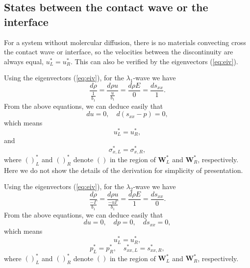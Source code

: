 \documentclass{article}
\numberwithin{equation}{section}
\numberwithin{table}{section}
\begin{document}
  \subsection{States between the  contact wave or the interface}
  For  a  system without molercular diffusion, there is no materials convecting  cross the contact wave or interface, so the velocities between the discontinuity are always equal, $u_L^* = u_R^*$. This can also be verified by the eigenvectors (\ref{eq:eiv}).

Using the eigenvectors (\ref{eq:eiv}), for the $\lambda_{1}$-wave we
have
\begin{equation}   \label{e23a}
\frac{d \rho}{\frac{1}{b_{1}}} = \frac{d \rho u}{\frac{u
}{b_{1}}}=\frac{d \rho E}{0} = \frac{d s_{xx}}{1}.
\end{equation}
From the above equations, we can deduce easily that
\begin{equation}   \label{e23b}
du = 0, \quad d(s_{xx}-p)=0,
\end{equation}
 which means
\begin{equation}   \label{e23c}
  u_{L}^{\ast}=u_{R}^{\ast},
\end{equation}
and
\begin{equation}   \label{e23d}
\sigma_{x,L}^{\ast}=\sigma_{x,R}^{\ast},
\end{equation}
where $()_{L}^{\ast}$ and $()_{R}^{\ast}$ denote $()$ in the region
of $\mathbf{W}_{L}^{\ast}$ and $\mathbf{W}_{R}^{\ast}$,
respectively. Here we do not show the details of the derivation for
simplicity of presentation.


Using the eigenvectors (\ref{eq:eiv}), for the $\lambda_{2}$-wave we
have
\begin{equation}   \label{e24a}
\frac{d \rho}{\frac{-\Gamma}{b_{1}}} = \frac{d \rho u}{\frac{-u
\Gamma}{b_{1}}}=\frac{d \rho E}{1} = \frac{d s_{xx}}{0}.
\end{equation}
From the above equations, we can deduce easily that
\begin{equation}   \label{e24b}
du = 0, \quad dp=0, \quad ds_{xx}=0,
\end{equation}
 which means
\begin{equation}   \label{e24c}
  u_{L}^{\ast}=u_{R}^{\ast},
\end{equation}
\begin{equation}   \label{e24d}
p_{L}^{\ast}=p_{R}^{\ast}, \quad
  s_{xx,L}^{\ast}=s_{xx,R}^{\ast},
\end{equation}
where $()_{L}^{\ast}$ and $()_{R}^{\ast}$ denote $()$ in the region
of $\mathbf{W}_{L}^{\ast}$ and $\mathbf{W}_{R}^{\ast}$,
respectively.
\end{document}
